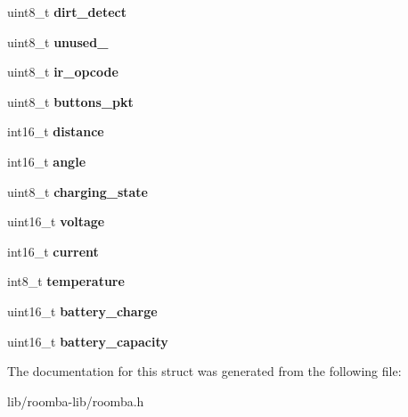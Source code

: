 \begin{DoxyCompactItemize}
\item 
\hypertarget{group__roomba-lib_ga9ccd750ef8615469466f93db2605cfa1}{}uint8\+\_\+t {\bfseries dirt\+\_\+detect}\label{group__roomba-lib_ga9ccd750ef8615469466f93db2605cfa1}

\item 
\hypertarget{group__roomba-lib_ga7601c93edd806422c44f23acb1f04e25}{}uint8\+\_\+t {\bfseries unused\+\_}\label{group__roomba-lib_ga7601c93edd806422c44f23acb1f04e25}

\item 
\hypertarget{group__roomba-lib_ga9f77bcc036318f7d862c433bcf7efd65}{}uint8\+\_\+t {\bfseries ir\+\_\+opcode}\label{group__roomba-lib_ga9f77bcc036318f7d862c433bcf7efd65}

\item 
\hypertarget{group__roomba-lib_ga401f999368acbd379c7711170b72de89}{}uint8\+\_\+t {\bfseries buttons\+\_\+pkt}\label{group__roomba-lib_ga401f999368acbd379c7711170b72de89}

\item 
\hypertarget{group__roomba-lib_ga1fcbb890062dd586ff86a086a602893d}{}int16\+\_\+t {\bfseries distance}\label{group__roomba-lib_ga1fcbb890062dd586ff86a086a602893d}

\item 
\hypertarget{group__roomba-lib_ga48231f4871a323c2b0a0f3d9597d5043}{}int16\+\_\+t {\bfseries angle}\label{group__roomba-lib_ga48231f4871a323c2b0a0f3d9597d5043}

\item 
\hypertarget{group__roomba-lib_ga2adb514c4766dd622c86e6d2bbc7485f}{}uint8\+\_\+t {\bfseries charging\+\_\+state}\label{group__roomba-lib_ga2adb514c4766dd622c86e6d2bbc7485f}

\item 
\hypertarget{group__roomba-lib_ga7ef5d3c12b11f7d3d09b827c0c3c54d3}{}uint16\+\_\+t {\bfseries voltage}\label{group__roomba-lib_ga7ef5d3c12b11f7d3d09b827c0c3c54d3}

\item 
\hypertarget{group__roomba-lib_ga61306111eac0f15e4e4d2d939a02bdd0}{}int16\+\_\+t {\bfseries current}\label{group__roomba-lib_ga61306111eac0f15e4e4d2d939a02bdd0}

\item 
\hypertarget{group__roomba-lib_gacc424a4672fd8b32df7f5268a79c8d7c}{}int8\+\_\+t {\bfseries temperature}\label{group__roomba-lib_gacc424a4672fd8b32df7f5268a79c8d7c}

\item 
\hypertarget{group__roomba-lib_gae544ca13929fe4c706f593cc2139ea3e}{}uint16\+\_\+t {\bfseries battery\+\_\+charge}\label{group__roomba-lib_gae544ca13929fe4c706f593cc2139ea3e}

\item 
\hypertarget{group__roomba-lib_ga8b4e0c15d144e27ee1e5dc3f0623afcb}{}uint16\+\_\+t {\bfseries battery\+\_\+capacity}\label{group__roomba-lib_ga8b4e0c15d144e27ee1e5dc3f0623afcb}

\end{DoxyCompactItemize}


The documentation for this struct was generated from the following file\+:\begin{DoxyCompactItemize}
\item 
lib/roomba-\/lib/roomba.\+h\end{DoxyCompactItemize}
